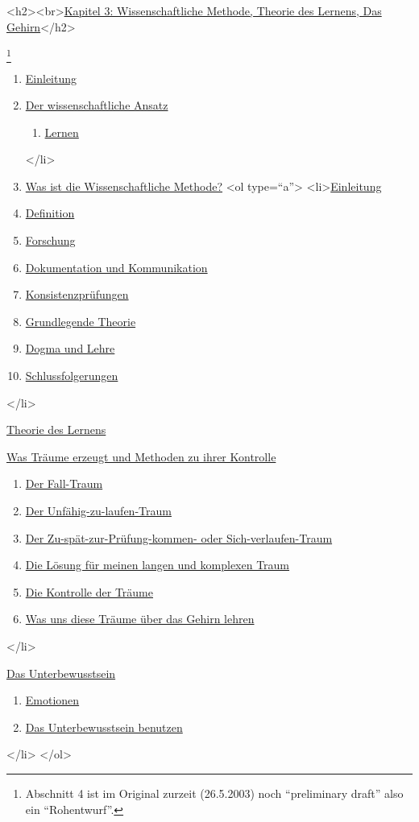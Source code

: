 <h2><br>\hyperref[c3_1]{Kapitel 3: Wissenschaftliche Methode, Theorie des Lernens, Das Gehirn}</h2>

\footnote{Abschnitt 4 ist im Original zurzeit (26.5.2003) noch \enquote{preliminary draft} also ein \enquote{Rohentwurf}.}


\begin{enumerate} 
 \item \hyperref[c3_1]{Einleitung}
 \item \hyperref[c3_2]{Der wissenschaftliche Ansatz}
  \begin{enumerate}[label={\alph*.}] 
   <li>\hyperref[c3_2a]{Einleitung}
   \item \hyperref[c3_2b]{Lernen}
  \end{enumerate}
 </li>
 \item \hyperref[c3_3]{Was ist die Wissenschaftliche Methode?}
  <ol type=\enquote{a}>
   <li>\hyperref[c3_3a]{Einleitung}
   \item \hyperref[c3_3b]{Definition}
   \item \hyperref[c3_3c]{Forschung}
   \item \hyperref[c3_3d]{Dokumentation und Kommunikation}
   \item \hyperref[c3_3e]{Konsistenzprüfungen}
   \item \hyperref[c3_3f]{Grundlegende Theorie}
   \item \hyperref[c3_3g]{Dogma und Lehre}
   \item \hyperref[c3_3h]{Schlussfolgerungen}
   \end{enumerate}
 </li>
 \item \hyperref[c3_4]{Theorie des Lernens}
 \item \hyperref[c3_5]{Was Träume erzeugt und Methoden zu ihrer Kontrolle}
  \begin{enumerate}[label={\alph*.}] 
   <li>\hyperref[c3_5a]{Einleitung}
   \item \hyperref[c3_5b]{Der Fall-Traum}
   \item \hyperref[c3_5c]{Der Unfähig-zu-laufen-Traum}
   \item \hyperref[c3_5d]{Der Zu-spät-zur-Prüfung-kommen- oder Sich-verlaufen-Traum}
   \item \hyperref[c3_5e]{Die Lösung für meinen langen und komplexen Traum}
   \item \hyperref[c3_5f]{Die Kontrolle der Träume}
   \item \hyperref[c3_5g]{Was uns diese Träume über das Gehirn lehren}
   \end{enumerate}
</li>
 \item \hyperref[c3_6]{Das Unterbewusstsein}
  \begin{enumerate}[label={\alph*.}] 
   <li>\hyperref[c3_6a]{Einleitung}
   \item \hyperref[c3_6b]{Emotionen}
   \item \hyperref[c3_6c]{Das Unterbewusstsein benutzen}
   \end{enumerate}
</li>
</ol>

